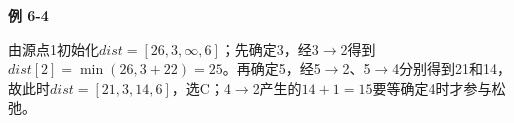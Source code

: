 {\color{ink}\bfseries 例 6-4}\par\vspace{1bp}由源点1初始化\(dist=\allowbreak{}[26,\allowbreak{}3,\allowbreak{}\infty ,\allowbreak{}6]\)；先确定3，经3\(\to \)2得到\(dist[2]=\allowbreak{}\operatorname{min}(26,\allowbreak{}3+\allowbreak{}22)=\allowbreak{}25\)。再确定5，经5\(\to \)2、5\(\to \)4分别得到21和14，故此时\(dist=\allowbreak{}[21,\allowbreak{}3,\allowbreak{}14,\allowbreak{}6]\)，选C；4\(\to \)2产生的\(14+\allowbreak{}1=\allowbreak{}15\)要等确定4时才参与松弛。
